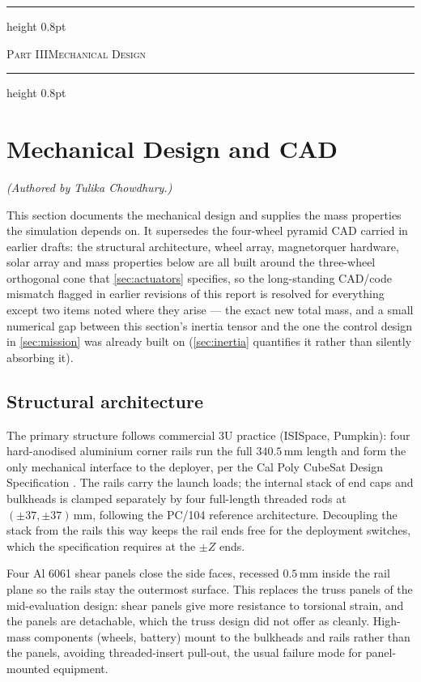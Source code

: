 \documentclass[conference,10pt,a4paper]{IEEEtran}
\newcommand{\NOTE}[1]{{\small\textit{(#1)}}}
\newcommand{\NOTE}[1]{}
\newcommand{\reportpart}[2]{%
  \par\medskip\noindent
  \hrule height 0.8pt\vspace{3pt}
  \centerline{\footnotesize\scshape Part #1\quad\textbar\quad #2}
  \vspace{3pt}\hrule height 0.8pt
  \par\medskip}
\newcommand{\unit}[1]{\ensuremath{\,\mathrm{#1}}}
\begin{document}
\reportpart{III}{Mechanical Design}

\section{Mechanical Design and CAD}
\label{sec:cad}

\NOTE{Authored by Tulika Chowdhury.}

This section documents the mechanical design and supplies the mass properties
the simulation depends on. It supersedes the four-wheel pyramid CAD carried in
earlier drafts: the structural architecture, wheel array, magnetorquer
hardware, solar array and mass properties below are all built around the
three-wheel orthogonal cone that \cref{sec:actuators} specifies, so the
long-standing CAD/code mismatch flagged in earlier revisions of this report is
resolved for everything except two items noted where they arise --- the exact
new total mass, and a small numerical gap between this section's inertia
tensor and the one the control design in \cref{sec:mission} was already built
on (\cref{sec:inertia} quantifies it rather than silently absorbing it).

\subsection{Structural architecture}
\label{sec:cad_structure}

The primary structure follows commercial 3U practice (ISISpace, Pumpkin): four
hard-anodised aluminium corner rails run the full $340.5\unit{mm}$ length and
form the only mechanical interface to the deployer, per the Cal Poly CubeSat
Design Specification \cite{cds}. The rails carry the launch loads; the internal
stack of end caps and bulkheads is clamped separately by four full-length
threaded rods at $(\pm37,\pm37)\unit{mm}$, following the PC/104 reference
architecture. Decoupling the stack from the rails this way keeps the rail ends
free for the deployment switches, which the specification requires at the
$\pm Z$ ends.

Four Al 6061 shear panels close the side faces, recessed $0.5\unit{mm}$ inside
the rail plane so the rails stay the outermost surface. This replaces the
truss panels of the mid-evaluation design: shear panels give more resistance to
torsional strain, and the panels are detachable, which the truss design did
not offer as cleanly. High-mass components (wheels, battery) mount to the
bulkheads and rails rather than the panels, avoiding threaded-insert pull-out,
the usual failure mode for panel-mounted equipment.
\end{document}
